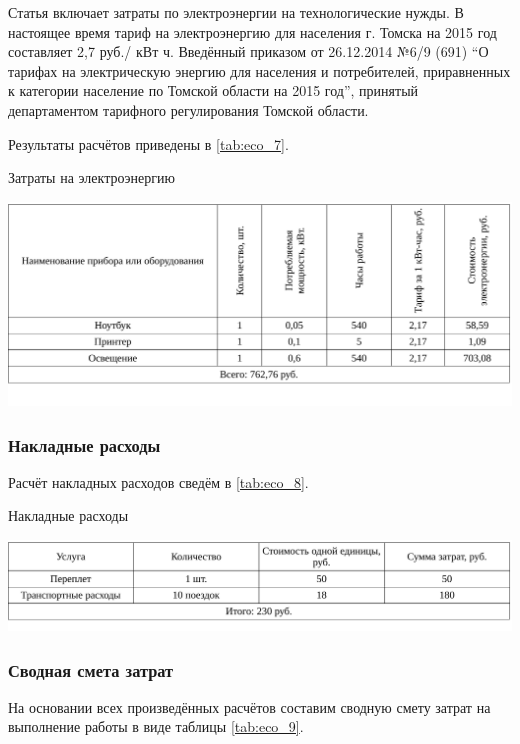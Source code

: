 Статья включает затраты по электроэнергии на технологические нужды. В настоящее время тариф на электроэнергию для населения г. Томска на 2015 год составляет 2,7 руб./ кВт ч. Введённый приказом от 26.12.2014 {\textquotedbl} №6/9 (691) ``О тарифах на электрическую энергию для населения и потребителей, приравненных к категории население по Томской области на 2015 год'', принятый департаментом тарифного регулирования Томской области.

Результаты расчётов приведены в \ref{tab:eco_7}.

\begin{table}[!ht]
\caption{Затраты на электроэнергию}
\centering
\includegraphics[page=1, width=1\linewidth]{econom_2.pdf}
\label{tab:eco_7}
\end{table}

\subsubsection{Накладные расходы}

Расчёт накладных расходов сведём в \ref{tab:eco_8}.

\begin{table}[!ht]
\caption{Накладные расходы}
\centering
\includegraphics[page=1, width=1\linewidth]{econom_3.pdf}
\label{tab:eco_8}
\end{table}

\subsubsection{Сводная смета затрат}

На основании всех произведённых расчётов составим сводную смету затрат на выполнение работы в виде таблицы \ref{tab:eco_9}.

